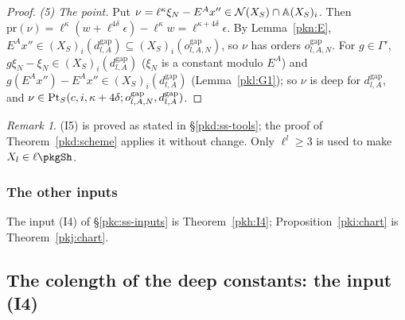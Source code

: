 \documentclass[10pt]{amsart}
\theoremstyle{definition}
\theoremstyle{remark}
\newtheorem{remark}[theorem]{Remark}
\newcommand{\Q}{\mathbb Q}
\begin{document}
\begin{proof}
\emph{(5) The point.} Put $\nu=\ell^\kappa\xi_N-E^Ax''\in\mathcal N(X_S)\cap\pkpAmb(X_S)_i$. Then
$\mathrm{pr}(\nu)=\ell^\kappa(w+\ell^{4\delta}\epsilon)-\ell^\kappa w=\ell^{\kappa+4\delta}\epsilon$. By
Lemma~\ref{pkn:E}, $E^Ax''\in(X_S)_i(d^{\mathrm{gap}}_{l,A})\subseteq(X_S)_i(o^{\mathrm{gap}}_{l,A,N})$, so
$\nu$ has orders $o^{\mathrm{gap}}_{l,A,N}$. For $g\in\Gamma'$, $g\xi_N-\xi_N\in(X_S)_i(d^{\mathrm{gap}}_{l,A})$
($\xi_N$ is a constant modulo $E^A$) and $g(E^Ax'')-E^Ax''\in(X_S)_i(d^{\mathrm{gap}}_{l,A})$
(Lemma~\ref{pkl:G1}); so $\nu$ is deep for $d^{\mathrm{gap}}_{l,A}$, and
$\nu\in\pkcPt_S(c,i,\kappa+4\delta;o^{\mathrm{gap}}_{l,A,N},d^{\mathrm{gap}}_{l,A})$.
\end{proof}

\begin{remark}
(I5) is proved as stated in \S\ref{pkd:ss-tools}; the proof of Theorem~\ref{pkd:scheme} applies it without
change. Only $\ell^l\ge3$ is used to make $X_l\in\ell\pkgSh$.
\end{remark}

\subsubsection{The other inputs}\label{pkg:ss-open}

The input (I4) of \S\ref{pkc:ss-inputs} is Theorem~\ref{pkh:I4}; Proposition~\ref{pki:chart} is
Theorem~\ref{pkj:chart}.



\providecommand{\auO}{\mathcal O}
\providecommand{\auQlb}{\overline{\Q}_\ell}
\providecommand{\pkpA}{A_{\mathrm{inf}}}
\providecommand{\pkpW}{W(C^\flat)}
\providecommand{\pkpAmb}{\mathbb A}
\providecommand{\pknBp}{B^+_{\mathrm{dR}}}
\providecommand{\pknB}{B_{\mathrm{dR}}}
\providecommand{\pknK}{\mathcal K_0}
\providecommand{\pktV}{V_{\mathrm{dR}}}
\providecommand{\pkcPt}{\mathrm{Pt}}
\providecommand{\pkcimp}{\mathrm{imp}}
\providecommand{\pkcNM}{\mathrm{NM}}
\providecommand{\pkcnw}{\mathrm{nw}}
\providecommand{\pkcSig}{\Sigma}
\providecommand{\pkiWin}{\operatorname{Win}}
\providecommand{\pglen}{\operatorname{len}}
\providecommand{\pkecost}{\mathrm{cost}}
\providecommand{\pkeDp}{\mathrm{Dp}}
\providecommand{\pkhD}{\mathcal D}
\providecommand{\pkhK}{\mathrm{Const}}
\providecommand{\pkhX}{\mathcal X}
\providecommand{\pkhup}[3]{#1^{+}_{#2,#3}}
\providecommand{\pkhlv}[2]{#1^{+}_{#2}}
\providecommand{\pkhrl}{\operatorname{rl}}

\subsection{The colength of the deep constants: the input (I4)}\label{pkh:sec}
\end{document}
